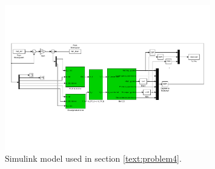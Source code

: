 \begin{figure}[h]
	\centering
		\includegraphics[width = 0.80\textwidth]{figures/4/simulink.pdf}
	\caption{Simulink model used in section \ref{text:problem4}.}
\end{figure}
